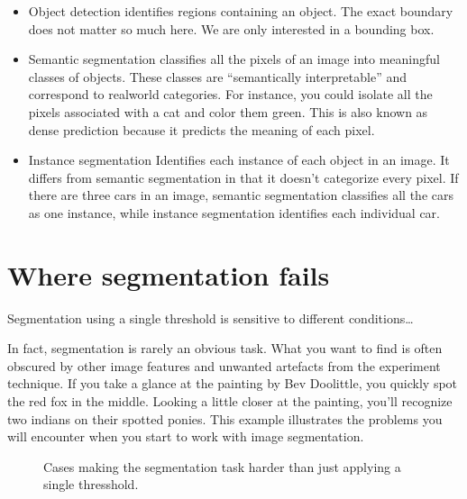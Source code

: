 \documentclass[letterpaper,10pt,english]{sphinxmanual}
\begin{document}
\sphinxAtStartPar
{}
\begin{itemize}
\item {} 
\sphinxAtStartPar
Object detection \sphinxhyphen{} identifies regions containing an object. The exact boundary does not matter so much here. We are only interested in a bounding box.

\item {} 
\sphinxAtStartPar
Semantic segmentation \sphinxhyphen{} classifies all the pixels of an image into meaningful classes of objects. These classes are “semantically interpretable” and correspond to real\sphinxhyphen{}world categories. For instance, you could isolate all the pixels associated with a cat and color them green. This is also known as dense prediction because it predicts the meaning of each pixel.

\item {} 
\sphinxAtStartPar
Instance segmentation \sphinxhyphen{} Identifies each instance of each object in an image. It differs from semantic segmentation in that it doesn’t categorize every pixel. If there are three cars in an image, semantic segmentation classifies all the cars as one instance, while instance segmentation identifies each individual car.

\end{itemize}


\chapter{Where segmentation fails}
\label{\detokenize{05-AdvancedSegmentation:where-segmentation-fails}}
\sphinxAtStartPar
Segmentation using a single threshold is sensitive to different conditions…

\sphinxAtStartPar
In fact, segmentation is rarely an obvious task. What you want to find is often obscured by other image features and unwanted artefacts from the experiment technique. If you take a glance at the painting by Bev Doolittle, you quickly spot the red fox in the middle. Looking a little closer at the painting, you’ll recognize two indians on their spotted ponies. This example illustrates the problems you will encounter when you start to work with image segmentation.

\begin{figure}[htbp]
\centering
\capstart

\noindent{}
\caption{Cases making the segmentation task harder than just applying a single thresshold.}\label{\detokenize{05-AdvancedSegmentation:id3}}\end{figure}
\end{document}
